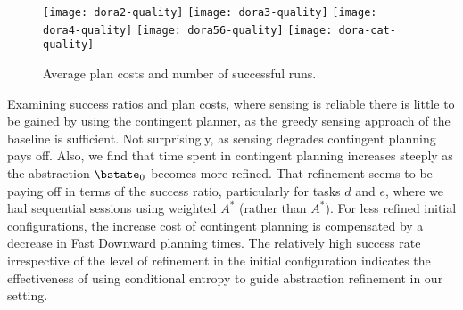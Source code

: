\begin{figure}[h!]
  \texttt{[image: dora2-quality]}\hfill
  \texttt{[image: dora3-quality]}\hfill
  \texttt{[image: dora4-quality]}\hfill
  \vspace{2mm}
  \texttt{[image: dora56-quality]}\hfill
  \vspace{2mm}
  \texttt{[image: dora-cat-quality]}\hfill
  \caption{Average plan costs and number of successful runs.}
  \label{fig:results-quality}
\end{figure}



Examining success ratios and plan costs, where sensing is reliable
there is little to be gained by using the contingent planner, as the
greedy sensing approach of the baseline is sufficient. Not
surprisingly, as sensing degrades contingent planning pays off.  Also,
we find that time spent in contingent planning increases steeply as
the abstraction $\bstate_0$ becomes more refined.  That refinement
seems to be paying off in terms of the success ratio, particularly for
tasks $d$ and $e$, where we had sequential sessions using weighted
$A^*$ (rather than $A^*$). For less refined initial configurations,
the increase cost of contingent planning is compensated by a decrease
in Fast Downward planning times. The relatively high success rate
irrespective of the level of refinement in the initial configuration
indicates the effectiveness of using conditional entropy to guide
abstraction refinement in our setting.










